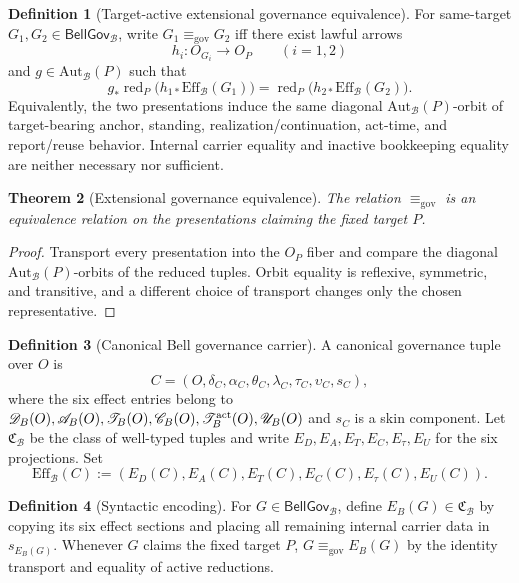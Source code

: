 \documentclass[11pt]{article}
\newtheorem{theorem}{Theorem}[section]
\theoremstyle{definition}
\newtheorem{definition}[theorem]{Definition}
\newcommand{\Bell}{\mathcal{B}}
\newcommand{\AutBell}{\mathrm{Aut}_{\Bell}(P)}
\newcommand{\GovEq}{\equiv_{\mathrm{gov}}}
\newcommand{\BellConstr}{\mathfrak{C}_{\Bell}}
\newcommand{\BellGov}{\mathsf{BellGov}_{\Bell}}
\newcommand{\GovEff}{\mathrm{Eff}_{\Bell}}
\newcommand{\ActRed}{\operatorname{red}_{P}}
\begin{document}
\begin{definition}[Target-active extensional governance equivalence]\label{def:governanceeffect}
For same-target $G_1,G_2\in\BellGov$, write $G_1\GovEq G_2$ iff there exist lawful arrows
\[
h_i:O_{G_i}\longrightarrow O_P\qquad(i=1,2)
\]
and $g\in\AutBell$ such that
\[
g_*\ActRed\bigl(h_{1*}\GovEff(G_1)\bigr)
=
\ActRed\bigl(h_{2*}\GovEff(G_2)\bigr).
\]
Equivalently, the two presentations induce the same diagonal $\AutBell$-orbit of target-bearing anchor, standing, realization/continuation, act-time, and report/reuse behavior. Internal carrier equality and inactive bookkeeping equality are neither necessary nor sufficient.
\end{definition}

\begin{theorem}[Extensional governance equivalence]\label{thm:governanceequivalence}
The relation $\GovEq$ is an equivalence relation on the presentations claiming the fixed target $P$.
\end{theorem}
\begin{proof}
Transport every presentation into the $O_P$ fiber and compare the diagonal $\AutBell$-orbits of the reduced tuples. Orbit equality is reflexive, symmetric, and transitive, and a different choice of transport changes only the chosen representative.
\end{proof}

\begin{definition}[Canonical Bell governance carrier]\label{def:candidateconstruction}
A canonical governance tuple over $O$ is
\[
C=(O,\delta_C,\alpha_C,\theta_C,\lambda_C,\tau_C,\upsilon_C,s_C),
\]
where the six effect entries belong to $\mathscr D_B(O),\mathscr A_B(O),\mathscr T_B(O),\mathscr C_B(O),\mathscr T_B^{\rm act}(O),\mathscr U_B(O)$ and $s_C$ is a skin component. Let $\BellConstr$ be the class of well-typed tuples and write $E_D,E_A,E_T,E_C,E_{\tau},E_U$ for the six projections. Set
\[
\GovEff(C):=(E_D(C),E_A(C),E_T(C),E_C(C),E_{\tau}(C),E_U(C)).
\]
\end{definition}

\begin{definition}[Syntactic encoding]\label{def:syntacticencoding}
For $G\in\BellGov$, define $E_B(G)\in\BellConstr$ by copying its six effect sections and placing all remaining internal carrier data in $s_{E_B(G)}$. Whenever $G$ claims the fixed target $P$, $G\GovEq E_B(G)$ by the identity transport and equality of active reductions.
\end{definition}
\end{document}
